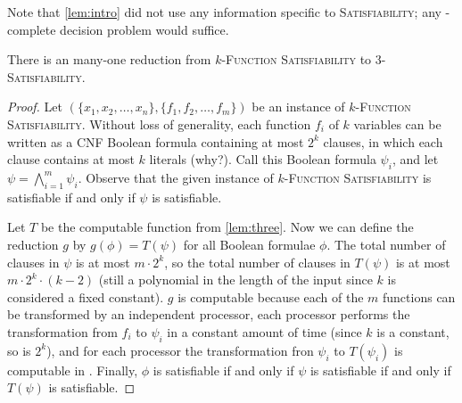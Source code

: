 \documentclass[]{article}
\begin{document}
Note that \autoref{lem:intro} did not use any information specific to \textsc{Satisfiability}; any \NP-complete decision problem would suffice.

\begin{lemma}\label{lem:decision}
  There is an \NC{} many-one reduction from \textsc{$k$-Function Satisfiability} to \textsc{3-Satisfiability}.
\end{lemma}
\begin{proof}
  Let $(\{x_1, x_2, \ldots, x_n\}, \{f_1, f_2, \ldots, f_m\})$ be an instance of \textsc{$k$-Function Satisfiability}.
  Without loss of generality, each function $f_i$ of $k$ variables can be written as a CNF Boolean formula containing at most $2^k$ clauses, in which each clause contains at most $k$ literals (why?).
  Call this Boolean formula $\psi_i$, and let $\psi = \bigwedge_{i = 1}^m{\psi_i}$.
  Observe that the given instance of \textsc{$k$-Function Satisfiability} is satisfiable if and only if $\psi$ is satisfiable.

  Let $T$ be the \NC{} computable function from \autoref{lem:three}.
  Now we can define the reduction $g$ by $g(\phi) = T(\psi)$ for all Boolean formulae $\phi$.
  The total number of clauses in $\psi$ is at most $m \cdot 2 ^ k$, so the total number of clauses in $T(\psi)$ is at most $m \cdot 2^k \cdot (k - 2)$ (still a polynomial in the length of the input since $k$ is considered a fixed constant).
  $g$ is \NC{} computable because each of the $m$ functions can be transformed by an independent processor, each processor performs the transformation from $f_i$ to $\psi_i$ in a constant amount of time (since $k$ is a constant, so is $2^k$), and for each processor the transformation fron $\psi_i$ to $T(\psi_i)$ is computable in \NC.
  Finally, $\phi$ is satisfiable if and only if $\psi$ is satisfiable if and only if $T(\psi)$ is satisfiable.
\end{proof}
\end{document}
